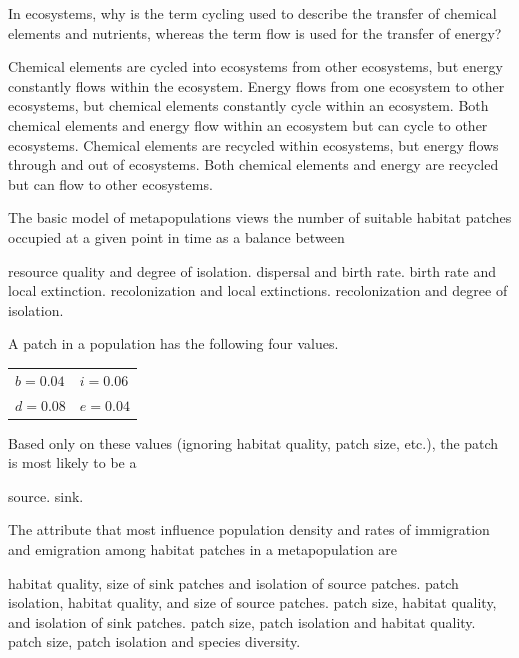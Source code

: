 \question
In ecosystems, why is the term cycling used to describe the transfer of chemical elements and nutrients, whereas the term flow is used for the transfer of energy?

\begin{choices}
\choice Chemical elements are cycled into ecosystems from other ecosystems, but energy constantly flows within the ecosystem.
\choice Energy flows from one ecosystem to other ecosystems, but chemical elements constantly cycle within an ecosystem.
\choice Both chemical elements and energy flow within an ecosystem but can cycle to other ecosystems.
\correctchoice Chemical elements are recycled within ecosystems, but energy flows through and out of ecosystems.
\choice Both chemical elements and energy are recycled but can flow to other ecosystems.
\end{choices}

\question
The basic model of metapopulations views the number of suitable habitat patches occupied at a given point in time as a balance between

\begin{choices}
\choice resource quality and degree of isolation. 
\choice dispersal and birth rate. 
\choice birth rate and local extinction. 
\correctchoice recolonization and local extinctions. 
\choice recolonization and degree of isolation. 
\end{choices}

\newpage

\question
A patch in a population has the following four values. 

\qquad\begin{tabular}{@{}ll@{}}
$b = 0.04$ & $i = 0.06$\\
$d = 0.08$ & $e = 0.04$\\
\end{tabular}

Based only on these values (ignoring habitat quality, patch size, etc.), the patch is most likely to be a 

\begin{choices}
\choice  source. 
\correctchoice  sink.
\end{choices}

\question
The attribute that most influence population density and rates of immigration and emigration among habitat patches in a metapopulation are

\begin{choices}
\choice habitat quality, size of sink patches and isolation of source patches. 
\choice patch isolation, habitat quality, and size of source patches. 
\choice patch size, habitat quality, and isolation of sink patches. 
\correctchoice patch size, patch isolation and habitat quality. 
\choice patch size, patch isolation and species diversity. 
\end{choices}

